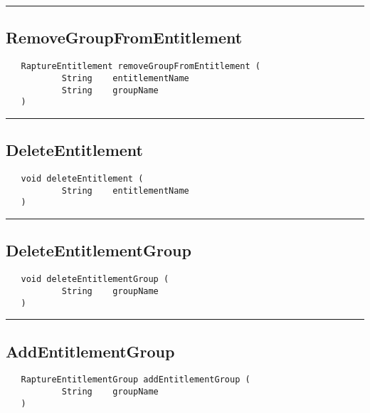 \rule{15cm}{2pt}
\subsection{RemoveGroupFromEntitlement}
\label{Api:RemoveGroupFromEntitlement}
\begin{verbatim}
   RaptureEntitlement removeGroupFromEntitlement (
           String    entitlementName
           String    groupName
   )
\end{verbatim}



\rule{15cm}{2pt}
\subsection{DeleteEntitlement}
\label{Api:DeleteEntitlement}
\begin{verbatim}
   void deleteEntitlement (
           String    entitlementName
   )
\end{verbatim}



\rule{15cm}{2pt}
\subsection{DeleteEntitlementGroup}
\label{Api:DeleteEntitlementGroup}
\begin{verbatim}
   void deleteEntitlementGroup (
           String    groupName
   )
\end{verbatim}



\rule{15cm}{2pt}
\subsection{AddEntitlementGroup}
\label{Api:AddEntitlementGroup}
\begin{verbatim}
   RaptureEntitlementGroup addEntitlementGroup (
           String    groupName
   )
\end{verbatim}



